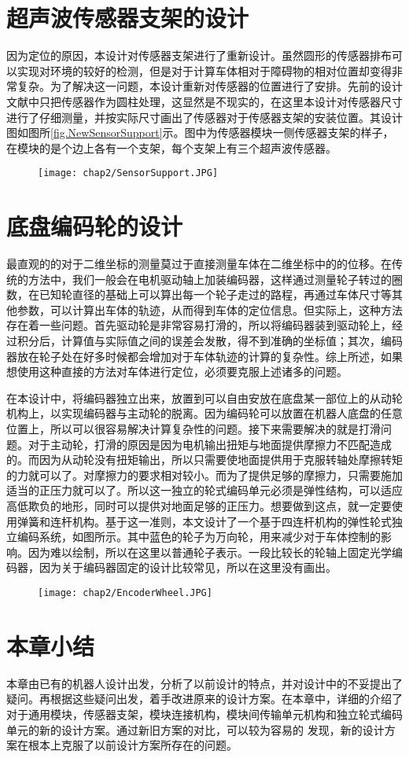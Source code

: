 \section{超声波传感器支架的设计}
因为定位的原因，本设计对传感器支架进行了重新设计。虽然圆形的传感器排布可以实现对环境的较好的检测，但是对于计算车体相对于障碍物的相对位置却变得非常复杂。为了解决这一问题，本设计重新对传感器的位置进行了安排。先前的设计文献中只把传感器作为圆柱处理，这显然是不现实的，在这里本设计对传感器尺寸进行了仔细测量，并按实际尺寸画出了传感器对于传感器支架的安装位置。其设计图如图所\ref{fig.NewSensorSupport}示。图中为传感器模块一侧传感器支架的样子，在模块的是个边上各有一个支架，每个支架上有三个超声波传感器。
\begin{figure}[!htp]
  \centering
  \texttt{[image: chap2/SensorSupport.JPG]}
\end{figure}
\section{底盘编码轮的设计}
最直观的的对于二维坐标的测量莫过于直接测量车体在二维坐标中的的位移。在传统的方法中，我们一般会在电机驱动轴上加装编码器，这样通过测量轮子转过的圈数，在已知轮直径的基础上可以算出每一个轮子走过的路程，再通过车体尺寸等其他参数，可以计算出车体的轨迹，从而得到车体的定位信息。但实际上，这种方法存在着一些问题。首先驱动轮是非常容易打滑的，所以将编码器装到驱动轮上，经过积分后，计算值与实际值之间的误差会发散，得不到准确的坐标值；其次，编码器放在轮子处在好多时候都会增加对于车体轨迹的计算的复杂性。综上所述，如果想使用这种直接的方法对车体进行定位，必须要克服上述诸多的问题。

在本设计中，将编码器独立出来，放置到可以自由安放在底盘某一部位上的从动轮机构上，以实现编码器与主动轮的脱离。因为编码轮可以放置在机器人底盘的任意位置上，所以可以很容易解决计算复杂性的问题。接下来需要解决的就是打滑问题。对于主动轮，打滑的原因是因为电机输出扭矩与地面提供摩擦力不匹配造成的。而因为从动轮没有扭矩输出，所以只需要使地面提供用于克服转轴处摩擦转矩的力就可以了。对摩擦力的要求相对较小。而为了提供足够的摩擦力，只需要施加适当的正压力就可以了。所以这一独立的轮式编码单元必须是弹性结构，可以适应高低欺负的地形，同时可以提供对地面足够的正压力。想要做到这点，就一定要使用弹簧和连杆机构。基于这一准则，本文设计了一个基于四连杆机构的弹性轮式独立编码系统，如图所示。其中蓝色的轮子为万向轮，用来减少对于车体控制的影响。因为难以绘制，所以在这里以普通轮子表示。一段比较长的轮轴上固定光学编码器，因为关于编码器固定的设计比较常见，所以在这里没有画出。
\begin{figure}[!htp]
  \centering
  \texttt{[image: chap2/EncoderWheel.JPG]}
\end{figure}
\section{本章小结}
本章由已有的机器人设计出发，分析了以前设计的特点，并对设计中的不妥提出了疑问。再根据这些疑问出发，着手改进原来的设计方案。在本章中，详细的介绍了对于通用模块，传感器支架，模块连接机构，模块间传输单元机构和独立轮式编码单元的新的设计方案。通过新旧方案的对比，可以较为容易的 发现，新的设计方案在根本上克服了以前设计方案所存在的问题。
